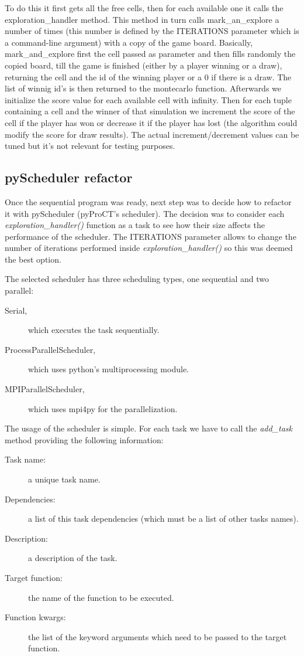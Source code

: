 To do this it first gets all the free cells, then for each available one it calls the exploration\_handler method. This method in turn calls mark\_an\_explore a number of times (this number is defined by the ITERATIONS parameter which is a command-line argument) with a copy of the game board. Basically, mark\_and\_explore first the cell passed as parameter and then fills randomly the copied board, till the game is finished (either by a player winning or a draw), returning the cell and the id of the winning player or a 0 if there is a draw. The list of winnig id's is then returned to the montecarlo function. Afterwards we initialize the score value for each available cell with infinity. Then for each tuple containing a cell and the winner of that simulation we increment the score of the cell if the player has won or decrease it if the player has lost (the algorithm could modify the score for draw results). The actual increment/decrement values can be tuned but it's not relevant for testing purposes. 

\subsection{pyScheduler refactor}

Once the sequential program was ready, next step was to decide how to refactor it with pyScheduler (pyProCT's scheduler). The decision was to consider each \textit{exploration\_handler()} function as a task to see how their size affects the performance of the scheduler. The ITERATIONS parameter allows to change the number of iterations performed inside \textit{exploration\_handler()} so this was deemed the best option. 

The selected scheduler has three scheduling types, one sequential and two parallel: 

\begin{description}
\item [Serial,] which executes the task sequentially.
\item [ProcessParallelScheduler,] which uses python's multiprocessing module.
\item [MPIParallelScheduler,] which uses mpi4py for the parallelization.
\end{description}

The usage of the scheduler is simple. For each task we have to call the \textit{add\_task} method providing the following information:

\begin{description}
\item [Task name:] a unique task name.
\item [Dependencies:] a list of this task dependencies (which must be a list of other tasks names).
\item [Description:] a description of the task.
\item [Target function:] the name of the function to be executed.
\item [Function kwargs:] the list of the keyword arguments which need to be passed to the target function.
\end{description}

